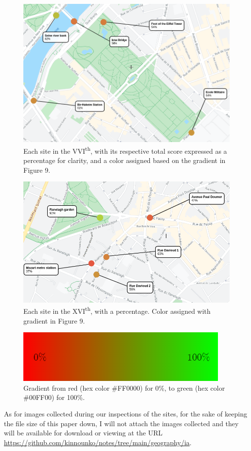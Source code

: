\documentclass[11pt,letterpaper]{article}
\begin{document}
\begin{figure}[H]
    \centering
    \includegraphics[width=0.7\linewidth]{media/7eColors.png}
    \caption{Each site in the VVI\textsuperscript{th}, with its respective total score expressed as a percentage for clarity, and a color assigned based on the gradient in Figure 9.}
\end{figure}

\begin{figure}[H]
    \centering
    \includegraphics[width=0.7\linewidth]{media/16eColors.png}
    \caption{Each site in the XVI\textsuperscript{th}, with a percentage. Color assigned with gradient in Figure 9.}
\end{figure}


\begin{figure}[H]
    \centering
    \includegraphics[width=0.4\linewidth]{media/bipolar/gradient.png}
    \caption{Gradient from red (hex color \#FF0000) for 0\%, to green (hex color \#00FF00) for 100\%. }
\end{figure}

As for images collected during our inspections of the sites, for the sake of keeping the file size of this paper down, I will not attach the images collected and they will be available for download or viewing at the URL \url{https://github.com/kinnounko/notes/tree/main/geography/ia}.
\end{document}

